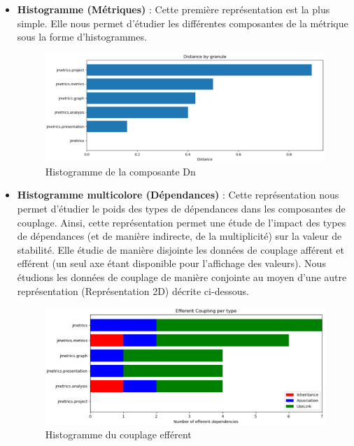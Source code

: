 \documentclass{scrartcl}
\begin{document}
    \begin{itemize}
        \item \textbf{Histogramme (Métriques)} : Cette première représentation est la plus simple. Elle nous permet d'étudier les différentes composantes de la métrique sous la forme d'histogrammes.
        \begin{figure}[h!]
            \centering
            \includegraphics[width=\textwidth]{img/plot/metrics_histogram_distance.png}
            \caption{Histogramme de la composante Dn}
        \end{figure}
        
        \item \textbf{Histogramme multicolore (Dépendances)} : Cette représentation nous permet d'étudier le poids des types de dépendances dans les composantes de couplage. Ainsi, cette représentation permet une étude de l'impact des types de dépendances (et de manière indirecte, de la multiplicité) sur la valeur de stabilité. Elle étudie de manière disjointe les données de couplage afférent et efférent (un seul axe étant disponible pour l'affichage des valeurs). Nous étudions les données de couplage de manière conjointe au moyen d'une autre représentation (Représentation 2D) décrite ci-dessous.
        \begin{figure}[h!]
            \centering
            \includegraphics[width=\textwidth]{img/plot/dependencies_histogram.png}
            \caption{Histogramme du couplage efférent}
        \end{figure}
        

\end{itemize}
\end{document}
